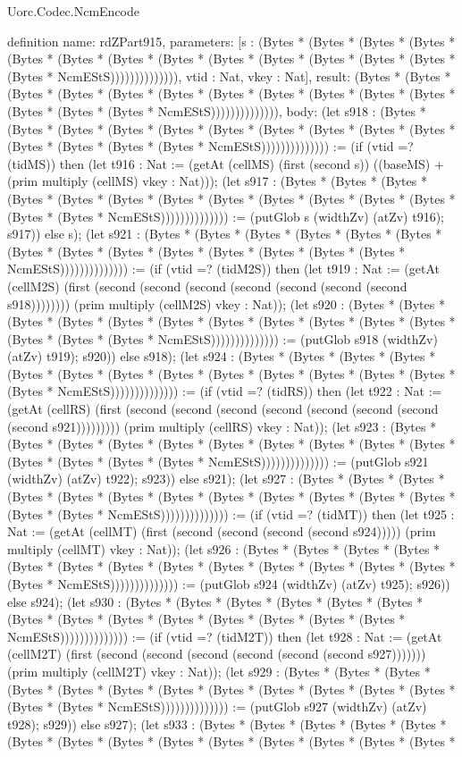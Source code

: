 \begin{lexlean}{Uorc.Codec.NcmEncode}
\begin{semanticmodule}
definition{
  name: rdZPart915,
  parameters: [s : (Bytes * (Bytes * (Bytes * (Bytes * (Bytes * (Bytes * (Bytes * (Bytes * (Bytes * (Bytes * (Bytes * (Bytes * (Bytes * (Bytes * NcmEStS)))))))))))))), vtid : Nat, vkey : Nat],
  result: (Bytes * (Bytes * (Bytes * (Bytes * (Bytes * (Bytes * (Bytes * (Bytes * (Bytes * (Bytes * (Bytes * (Bytes * (Bytes * (Bytes * NcmEStS)))))))))))))),
  body: (let s918 : (Bytes * (Bytes * (Bytes * (Bytes * (Bytes * (Bytes * (Bytes * (Bytes * (Bytes * (Bytes * (Bytes * (Bytes * (Bytes * (Bytes * NcmEStS)))))))))))))) := (if (vtid =? (tidMS)) then (let t916 : Nat := (getAt (cellMS) (first (second s)) ((baseMS) + (prim multiply (cellMS) vkey : Nat))); (let s917 : (Bytes * (Bytes * (Bytes * (Bytes * (Bytes * (Bytes * (Bytes * (Bytes * (Bytes * (Bytes * (Bytes * (Bytes * (Bytes * (Bytes * NcmEStS)))))))))))))) := (putGlob s (widthZv) (atZv) t916); s917)) else s); (let s921 : (Bytes * (Bytes * (Bytes * (Bytes * (Bytes * (Bytes * (Bytes * (Bytes * (Bytes * (Bytes * (Bytes * (Bytes * (Bytes * (Bytes * NcmEStS)))))))))))))) := (if (vtid =? (tidM2S)) then (let t919 : Nat := (getAt (cellM2S) (first (second (second (second (second (second (second (second s918)))))))) (prim multiply (cellM2S) vkey : Nat)); (let s920 : (Bytes * (Bytes * (Bytes * (Bytes * (Bytes * (Bytes * (Bytes * (Bytes * (Bytes * (Bytes * (Bytes * (Bytes * (Bytes * (Bytes * NcmEStS)))))))))))))) := (putGlob s918 (widthZv) (atZv) t919); s920)) else s918); (let s924 : (Bytes * (Bytes * (Bytes * (Bytes * (Bytes * (Bytes * (Bytes * (Bytes * (Bytes * (Bytes * (Bytes * (Bytes * (Bytes * (Bytes * NcmEStS)))))))))))))) := (if (vtid =? (tidRS)) then (let t922 : Nat := (getAt (cellRS) (first (second (second (second (second (second (second (second (second s921))))))))) (prim multiply (cellRS) vkey : Nat)); (let s923 : (Bytes * (Bytes * (Bytes * (Bytes * (Bytes * (Bytes * (Bytes * (Bytes * (Bytes * (Bytes * (Bytes * (Bytes * (Bytes * (Bytes * NcmEStS)))))))))))))) := (putGlob s921 (widthZv) (atZv) t922); s923)) else s921); (let s927 : (Bytes * (Bytes * (Bytes * (Bytes * (Bytes * (Bytes * (Bytes * (Bytes * (Bytes * (Bytes * (Bytes * (Bytes * (Bytes * (Bytes * NcmEStS)))))))))))))) := (if (vtid =? (tidMT)) then (let t925 : Nat := (getAt (cellMT) (first (second (second (second (second s924))))) (prim multiply (cellMT) vkey : Nat)); (let s926 : (Bytes * (Bytes * (Bytes * (Bytes * (Bytes * (Bytes * (Bytes * (Bytes * (Bytes * (Bytes * (Bytes * (Bytes * (Bytes * (Bytes * NcmEStS)))))))))))))) := (putGlob s924 (widthZv) (atZv) t925); s926)) else s924); (let s930 : (Bytes * (Bytes * (Bytes * (Bytes * (Bytes * (Bytes * (Bytes * (Bytes * (Bytes * (Bytes * (Bytes * (Bytes * (Bytes * (Bytes * NcmEStS)))))))))))))) := (if (vtid =? (tidM2T)) then (let t928 : Nat := (getAt (cellM2T) (first (second (second (second (second (second (second s927))))))) (prim multiply (cellM2T) vkey : Nat)); (let s929 : (Bytes * (Bytes * (Bytes * (Bytes * (Bytes * (Bytes * (Bytes * (Bytes * (Bytes * (Bytes * (Bytes * (Bytes * (Bytes * (Bytes * NcmEStS)))))))))))))) := (putGlob s927 (widthZv) (atZv) t928); s929)) else s927); (let s933 : (Bytes * (Bytes * (Bytes * (Bytes * (Bytes * (Bytes * (Bytes * (Bytes * (Bytes * (Bytes * (Bytes * (Bytes * (Bytes * (Bytes * }
\end{semanticmodule}
\end{lexlean}
